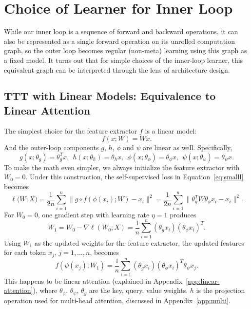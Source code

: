 \documentclass{article}
\begin{document}
\section{Choice of Learner for Inner Loop}
While our inner loop is a sequence of forward and backward operations, it can also be represented as a single forward operation on its unrolled computation graph, so the outer loop becomes regular (non-meta) learning using this graph as a fixed model.
It turns out that for simple choices of the inner-loop learner, this equivalent graph can be interpreted through the lens of architecture design.

\label{sec:learner}
\subsection{TTT with Linear Models: Equivalence to Linear Attention}
\label{subsec:linear}
The simplest choice for the feature extractor $f$ is a linear model:
\begin{equation}
f(x; W) = W x.
\end{equation}
And the outer-loop components $g$, $h$, $\phi$ and $\psi$ are linear as well. Specifically, 
\begin{equation}
g(x; \theta_g) = \theta_g^T x,~~
h(x; \theta_h) = \theta_h x,~~
\phi(x; \theta_\phi) = \theta_\phi x,~~
\psi(x; \theta_\psi) = \theta_\psi x.
\end{equation}
To make the math even simpler, we always initialize the feature extractor with $W_0 = 0$.
Under this construction, the self-supervised loss in Equation~\ref{eq:smalll} becomes
\begin{equation}
\label{eq:tokl}
\ell\big( W; X \big) 
= \frac{1}{2n} \sum_{i=1}^n\| g \circ f\left(\phi(x_i); W\right) -  x_i \|^2 
= \frac{1}{2n} \sum_{i=1}^n \|\theta_g^TW \theta_\phi x_i - x_i\|^2.
\end{equation}
For $W_0 = 0$, one gradient step with learning rate $\eta=1$ produces
\begin{equation}
W_1 = W_0 - \nabla \ell\left(W_0; X\right) 
= \frac{1}{n} \sum_{i=1}^n (\theta_g x_i) (\theta_\phi x_i)^T.
\end{equation}
Using $W_1$ as the updated weights for the feature extractor, the updated features for each token $x_j$, $j=1,\dots,n$, becomes
\begin{equation}
f\left(\psi(x_j); W_1\right)
 = \frac{1}{n} \sum_{i=1}^n (\theta_g x_i) (\theta_\phi x_i)^T \theta_\psi x_j.
\end{equation}
This happens to be linear attention (explained in Appendix~\ref{app:linear-attention}), where $\theta_\phi$, $\theta_\psi$, $\theta_g$ are the key, query, value weights.
$h$ is the projection operation used for multi-head attention, discussed in Appendix~\ref{app:multi}.
\end{document}
